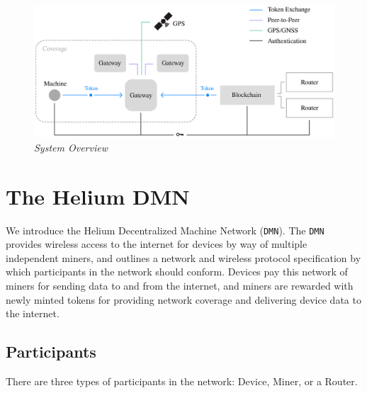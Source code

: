 \documentclass[UTF8, 10pt, nonatbib, nocopyrightspace, reprint]{sigplanconf}
\begin{document}
\begin{figure}[ht]
    \begin{center}
          \includegraphics[width=\textwidth]{schematic.eps}
          \caption{\emph{System Overview}}
          \label{fig:system}
     \end{center}
\end{figure}


\section{The Helium DMN}

We introduce the Helium Decentralized Machine Network (\verb|DMN|). The \verb|DMN| provides wireless access to the internet for devices by way of multiple independent miners, and outlines a network and wireless protocol specification by which participants in the network should conform. Devices pay this network of miners for sending data to and from the internet, and miners are rewarded with newly minted tokens for providing network coverage and delivering device data to the internet.

\subsection{Participants}

There are three types of participants in the network: Device, Miner, or a Router.
\end{document}
